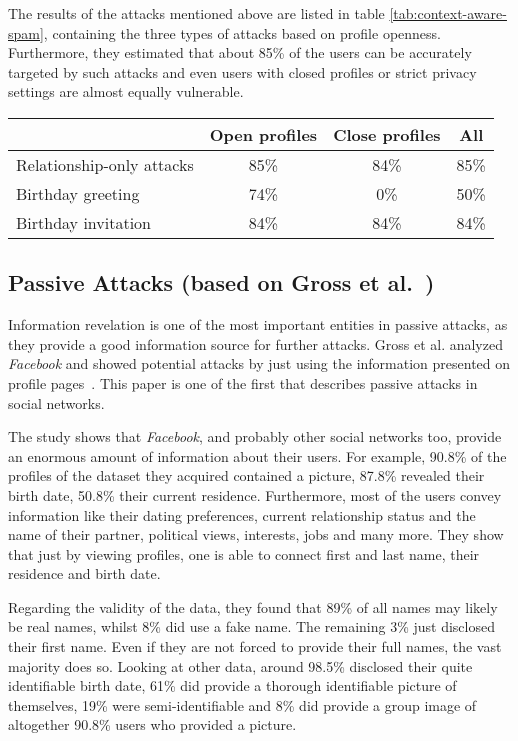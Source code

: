 The results of the attacks mentioned above are listed in table
\ref{tab:context-aware-spam}, containing the three types of attacks based on
profile openness. Furthermore, they estimated that about 85\% of the users
can be accurately targeted by such attacks and even users with closed
profiles or strict privacy settings are almost equally vulnerable.

\begin{table*}[ht]
  \centering
  \begin{tabular}{lccc}
    \toprule
    & Open profiles & Close profiles & All\\
    \midrule
    Relationship-only attacks & 85\% & 84\% & 85\% \\
    Birthday greeting         & 74\% &  0\% & 50\% \\
    Birthday invitation       & 84\% & 84\% & 84\% \\
    \bottomrule
  \end{tabular}
  \caption{Results of the case study of Brown et al.~\cite{brown2008}}
  \label{tab:context-aware-spam}
\end{table*}

\subsection[Passive Attacks]{Passive Attacks (based on Gross et al.~\cite{gross2005})}

Information revelation is one of the most important entities in passive attacks,
as they provide a good information source for further attacks. Gross et al.
analyzed \textit{Facebook} and showed potential attacks by just using the
information presented on profile pages~\cite{gross2005}. This paper is one
of the first that describes passive attacks in social networks.

The study shows that \textit{Facebook}, and probably other social networks
too, provide an enormous amount of information about their users. For example,
90.8\% of the profiles of the dataset they acquired contained a picture, 87.8\%
revealed their birth date, 50.8\% their current residence. Furthermore, most of
the users convey information like their dating preferences, current relationship
status and the name of their partner, political views, interests, jobs and many
more. They show that just by viewing profiles, one is able to connect first
and last name, their residence and birth date.

Regarding the validity of the data, they found that 89\% of all names may
likely be real names, whilst 8\% did use a fake name. The remaining 3\% just
disclosed their first name. Even if they are not forced to provide their full
names, the vast majority does so. Looking at other data, around 98.5\% disclosed
their quite identifiable birth date, 61\% did provide a thorough identifiable
picture of themselves, 19\% were semi-identifiable and 8\% did provide a group
image of altogether 90.8\% users who provided a picture.

